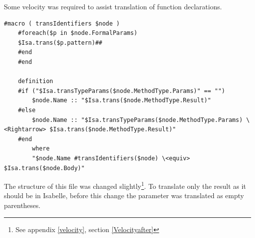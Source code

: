 	Some velocity was required to assist translation of function declarations.
	\begin{lstlisting}[language=Velocity]
	#macro ( transIdentifiers $node )
	#foreach($p in $node.FormalParams)
	$Isa.trans($p.pattern)##
	#end
	#end

	definition
	#if ("$Isa.transTypeParams($node.MethodType.Params)" == "")
		$node.Name :: "$Isa.trans($node.MethodType.Result)"
	#else
		$node.Name :: "$Isa.transTypeParams($node.MethodType.Params) \<Rightarrow> $Isa.trans($node.MethodType.Result)"
	#end
	    where
	    "$node.Name #transIdentifiers($node) \<equiv> $Isa.trans($node.Body)"
	\end{lstlisting}
	The structure of this file was changed slightly\footnote{See appendix \ref{velocity}, section \ref{Velocityafter}}. To translate only the result as it should be in Isabelle, before this change the parameter was translated as empty parentheses.

